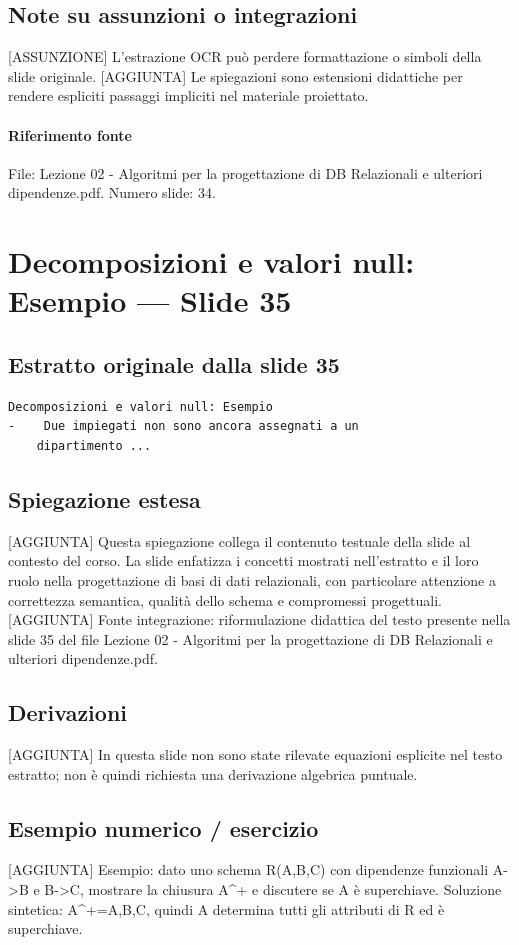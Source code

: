 \documentclass[11pt]{article}
\begin{document}
\subsection*{Note su assunzioni o integrazioni}
[ASSUNZIONE] L'estrazione OCR può perdere formattazione o simboli della slide originale.
[AGGIUNTA] Le spiegazioni sono estensioni didattiche per rendere espliciti passaggi impliciti nel materiale proiettato.
\paragraph{Riferimento fonte} File: Lezione 02 - Algoritmi per la progettazione di DB Relazionali e ulteriori dipendenze.pdf. Numero slide: 34.
\section{Decomposizioni e valori null: Esempio --- Slide 35}
\subsection*{Estratto originale dalla slide 35}
\begin{lstlisting}
Decomposizioni e valori null: Esempio
-    Due impiegati non sono ancora assegnati a un
    dipartimento ...
\end{lstlisting}
\subsection*{Spiegazione estesa}
[AGGIUNTA] Questa spiegazione collega il contenuto testuale della slide al contesto del corso. La slide enfatizza i concetti mostrati nell'estratto e il loro ruolo nella progettazione di basi di dati relazionali, con particolare attenzione a correttezza semantica, qualità dello schema e compromessi progettuali.
[AGGIUNTA] Fonte integrazione: riformulazione didattica del testo presente nella slide 35 del file Lezione 02 - Algoritmi per la progettazione di DB Relazionali e ulteriori dipendenze.pdf.
\subsection*{Derivazioni}
[AGGIUNTA] In questa slide non sono state rilevate equazioni esplicite nel testo estratto; non è quindi richiesta una derivazione algebrica puntuale.
\subsection*{Esempio numerico / esercizio}
[AGGIUNTA] Esempio: dato uno schema R(A,B,C) con dipendenze funzionali A->B e B->C, mostrare la chiusura A^+ e discutere se A è superchiave. Soluzione sintetica: A^+={A,B,C}, quindi A determina tutti gli attributi di R ed è superchiave.
\end{document}
